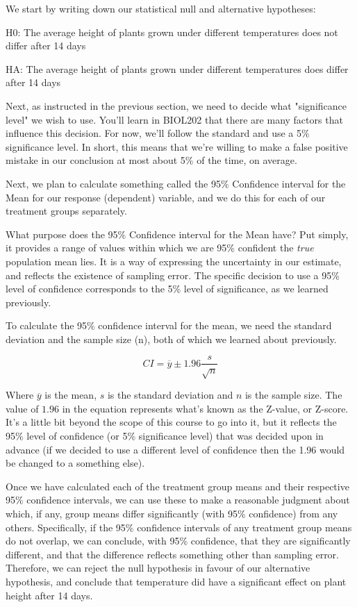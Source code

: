 \documentclass[
]{book}
\begin{document}
We start by writing down our statistical null and alternative hypotheses:

H0: The average height of plants grown under different temperatures does not differ after 14 days

HA: The average height of plants grown under different temperatures does differ after 14 days

Next, as instructed in the previous section, we need to decide what "significance level" we wish to use. You'll learn in BIOL202 that there are many factors that influence this decision. For now, we'll follow the standard and use a 5\% significance level. In short, this means that we're willing to make a false positive mistake in our conclusion at most about 5\% of the time, on average.

Next, we plan to calculate something called the 95\% Confidence interval for the Mean for our response (dependent) variable, and we do this for each of our treatment groups separately.

What purpose does the 95\% Confidence interval for the Mean have? Put simply, it provides a range of values within which we are 95\% confident the \emph{true} population mean lies. It is a way of expressing the uncertainty in our estimate, and reflects the existence of sampling error. The specific decision to use a 95\% level of confidence corresponds to the 5\% level of significance, as we learned previously.

To calculate the 95\% confidence interval for the mean, we need the standard deviation and the sample size (n), both of which we learned about previously.

\[CI=\overline{y}\pm 1.96 \frac{s}{\sqrt{n}}\]

Where \(\overline{y}\) is the mean, \(s\) is the standard deviation and \(n\) is the sample size. The value of \(1.96\) in the equation represents what's known as the Z-value, or Z-score. It's a little bit beyond the scope of this course to go into it, but it reflects the 95\% level of confidence (or 5\% significance level) that was decided upon in advance (if we decided to use a different level of confidence then the 1.96 would be changed to a something else).

Once we have calculated each of the treatment group means and their respective 95\% confidence intervals, we can use these to make a reasonable judgment about which, if any, group means differ significantly (with 95\% confidence) from any others. Specifically, if the 95\% confidence intervals of any treatment group means do not overlap, we can conclude, with 95\% confidence, that they are significantly different, and that the difference reflects something other than sampling error. Therefore, we can reject the null hypothesis in favour of our alternative hypothesis, and conclude that temperature did have a significant effect on plant height after 14 days.
\end{document}
